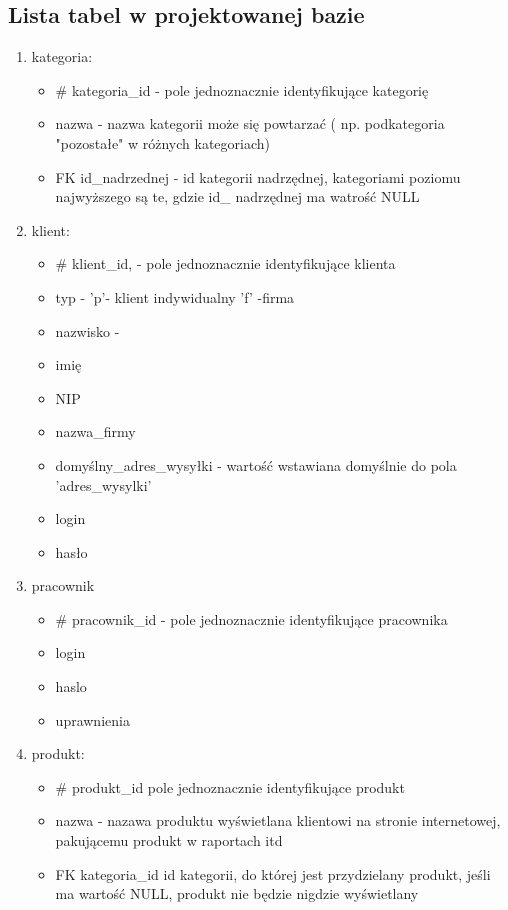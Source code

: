 \subsection{Lista tabel w projektowanej bazie}
\begin{enumerate}
\item kategoria:
\begin{itemize}
	\item \# kategoria\_id - pole jednoznacznie identyfikujące kategorię
	\item nazwa - nazwa kategorii może się powtarzać ( np. podkategoria "pozostałe" w różnych kategoriach)
	\item FK id\_nadrzednej - id kategorii nadrzędnej, kategoriami poziomu najwyższego są te, gdzie id\_ nadrzędnej ma watrość NULL
\end{itemize}
\item klient:
\begin{itemize}
	\item \# klient\_id, - pole jednoznacznie identyfikujące klienta
	\item typ - 'p'- klient indywidualny 'f' -firma
	\item nazwisko -
	\item imię 
	\item NIP 
	\item nazwa\_firmy 
	\item domyślny\_adres\_wysyłki - wartość wstawiana domyślnie do pola 'adres\_wysylki'
	\item login 
	\item hasło
	\end{itemize}
\item pracownik
\begin{itemize}
	\item \# pracownik\_id - pole jednoznacznie identyfikujące pracownika
	\item login
	\item haslo
	\item uprawnienia	
	\end{itemize} 
\item produkt:
\begin{itemize}
	\item \# produkt\_id pole jednoznacznie identyfikujące produkt
	\item nazwa - nazawa produktu wyświetlana klientowi na stronie internetowej, pakującemu produkt w raportach itd
	\item FK kategoria\_id id kategorii, do której jest przydzielany produkt, jeśli ma wartość NULL, produkt nie będzie nigdzie wyświetlany

\end{itemize}
\end{enumerate}
